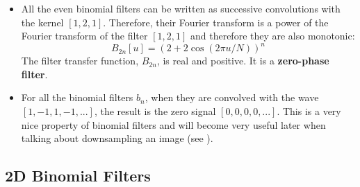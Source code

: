 \begin{itemize}
	\item All the even binomial filters can be written as successive convolutions with the kernel $\left[1,2,1\right]$. Therefore, their Fourier transform is a power of the Fourier transform of the filter $\left[1,2,1\right]$ and therefore they are also monotonic:
	      \begin{equation}
		      B_{2n} \left[u\right] = (2+2 \cos (2 \pi u/N))^n
	      \end{equation}
	      The filter transfer function, $B_{2n}$, is real and positive. It is a {\bf zero-phase filter}.

	\item For all the binomial filters $b_n$, when they are convolved with the wave $\left[1,-1,1,-1,...\right]$, the result is the zero signal $\left[0,0,0,0,...\right]$. This is a very nice property of binomial filters and will become very useful later when talking about downsampling an image (see \chap{\ref{chap:downsampling_and_upsampling}}).
\end{itemize}

\subsection{2D Binomial Filters}

